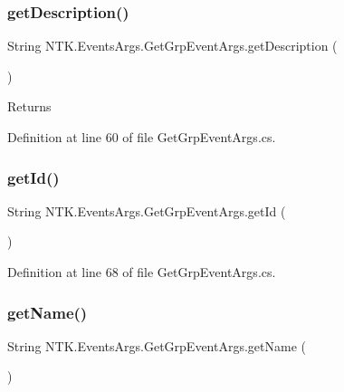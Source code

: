 \subsubsection{\texorpdfstring{getDescription()}{getDescription()}}
{\footnotesize\ttfamily String N\+T\+K.\+Events\+Args.\+Get\+Grp\+Event\+Args.\+get\+Description (\begin{DoxyParamCaption}{ }\end{DoxyParamCaption})}





\begin{DoxyReturn}{Returns}

\end{DoxyReturn}


Definition at line 60 of file Get\+Grp\+Event\+Args.\+cs.

\mbox{\label{class_n_t_k_1_1_events_args_1_1_get_grp_event_args_af7f2f0deae86c4af8aeeb288de1c511b}} 
\subsubsection{\texorpdfstring{getId()}{getId()}}
{\footnotesize\ttfamily String N\+T\+K.\+Events\+Args.\+Get\+Grp\+Event\+Args.\+get\+Id (\begin{DoxyParamCaption}{ }\end{DoxyParamCaption})}



Definition at line 68 of file Get\+Grp\+Event\+Args.\+cs.

\mbox{\label{class_n_t_k_1_1_events_args_1_1_get_grp_event_args_a8fab473bcc6838b785d9d134fe83df92}} 
\subsubsection{\texorpdfstring{getName()}{getName()}}
{\footnotesize\ttfamily String N\+T\+K.\+Events\+Args.\+Get\+Grp\+Event\+Args.\+get\+Name (\begin{DoxyParamCaption}{ }\end{DoxyParamCaption})}






